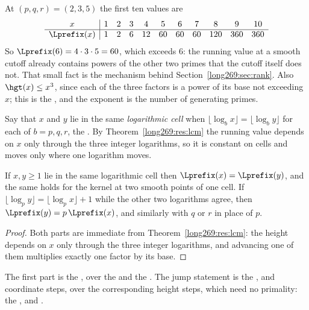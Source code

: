 At $(p,q,r)=(2,3,5)$ the first ten values are
\[
\begin{array}{c|cccccccccc}
x&1&2&3&4&5&6&7&8&9&10\\ \hline
\Lprefix(x)&1&2&6&12&60&60&60&120&360&360
\end{array}
\]
So $\Lprefix(6)=4\cdot3\cdot5=60$, which exceeds $6$: the running value at a
smooth cutoff already contains powers of the other two primes that the cutoff
itself does not.  That small fact is the mechanism behind
Section~\ref{long269:sec:rank}.  Also $\hgt(x)\le x^{3}$, since each of the three
factors is a power of its base not exceeding $x$; this is the
, and the exponent is the number of generating primes.

Say that $x$ and $y$ lie in the same \emph{logarithmic cell} when
$\lfloor\log_b x\rfloor=\lfloor\log_b y\rfloor$ for each of $b=p,q,r$, the
.  By Theorem~\ref{long269:res:lcm} the running value depends on $x$ only
through the three integer logarithms, so it is constant on cells and moves only
where one logarithm moves.

\begin{proposition}\label{long269:res:cell}
If $x,y\ge1$ lie in the same logarithmic cell then $\Lprefix(x)=\Lprefix(y)$,
and the same holds for the kernel at two smooth points of one cell.  If
$\lfloor\log_p y\rfloor=\lfloor\log_p x\rfloor+1$ while the other two
logarithms agree, then $\Lprefix(y)=p\,\Lprefix(x)$, and similarly with $q$ or
$r$ in place of $p$.
\end{proposition}

\begin{proof}
Both parts are immediate from Theorem~\ref{long269:res:lcm}: the height depends on $x$
only through the three integer logarithms, and advancing one of them multiplies
exactly one factor by its base.
\end{proof}

\noindent The first part is the
, over the
 and the
.  The jump statement is
\label{long269:res:jump}the
,
and
coordinate steps, over the corresponding height steps, which need no primality:
the
,
and
.

